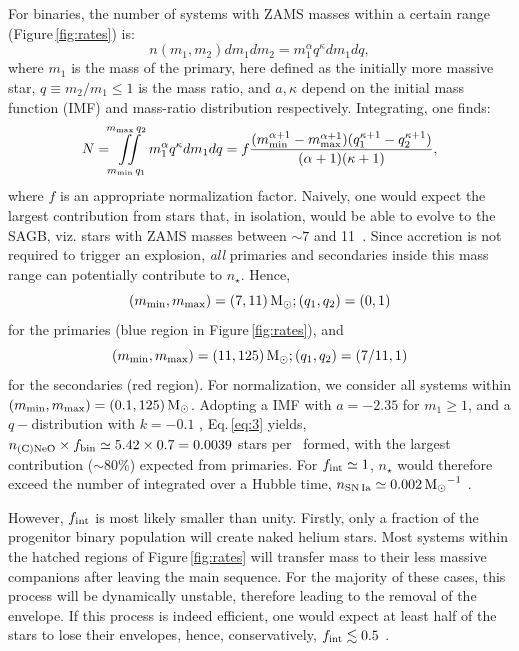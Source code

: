 \documentclass[../../main/thesis_msc.tex]{subfiles}
\begin{document}
For binaries, the number of systems with ZAMS masses within a certain range (Figure\,\ref{fig:rates}) is:
\begin{equation}
n(m_1,m_2)dm_1dm_2 = m_1^{\alpha}q^{\kappa}dm_1dq,
\end{equation}
where $m_1$ is the mass of the primary, here defined as the initially more massive star, 
$q\equiv m_2/m_1\leq 1$ is the mass ratio, and $a,\kappa$ depend on the 
initial mass function (IMF) and mass-ratio distribution respectively. Integrating, one finds:
\begin{equation}\label{eq:3}
\begin{split}
N =  
\iint\limits_{m_{\rm min}\,q_{1}}^{m_{\rm max}\,q_{2}}m_1^{\alpha}q^{\kappa}dm_1dq  
 = f\frac{(m_{\rm min}^{\alpha+1} - m_{\rm max}^{\alpha+1})(q_{1}^{\kappa+1} -  q_{2}^{\kappa+1})}{(\alpha+1)(\kappa+1)}, 
\end{split}
\end{equation}
where $f$ is an appropriate normalization factor. 
Naively, one would expect the largest contribution from stars  that, in isolation, would be able to evolve
to the SAGB, viz. stars with ZAMS masses between $\sim 7$ and 11\msun\ \citep{Farmer:2015afs}. 
Since accretion is not required to trigger an explosion, 
\emph{all} primaries and secondaries inside this mass range 
can potentially contribute to $n_\star$. Hence, $$(m_{\rm min},m_{\rm max})=(7,11)\mathrm{\,M_\odot};(q_1,q_2)=(0,1)$$ for the primaries (blue region in 
Figure\,\ref{fig:rates}), and $$(m_{\rm min},m_{\rm max})=(11,125)\mathrm{\,M_\odot};(q_1,q_2)=(7/11,1)$$ for the secondaries (red region). For normalization, we consider all systems within $(m_{\rm min},m_{\rm max})=(0.1,125)\mathrm{\,M_\odot}$. Adopting a 
\cite{Chabrier:2004vw} IMF with $a=-2.35$ for $m_1 \ge 1$, and a $q-$distribution with $k=-0.1$ \citep{Sana:2012px},
Eq.\,\ref{eq:3} yields, $n_{\rm \one}\times f_{\rm bin} \simeq 5.42\times 0.7=0.0039$ stars per \msun\ formed, with the largest contribution ($\sim 80\%$) expected from primaries. For $f_{\rm int}\simeq 1$, $n_\star$ would therefore exceed the number of \ia  integrated over a Hubble time, $n_{\rm SN\,Ia}\simeq0.002\mathrm{\,M_\odot}^{-1}$ \citep{Maoz:2013hna}.

However, $f_{\rm int}$ is most likely smaller than unity. Firstly, only a fraction of 
the progenitor binary population will create naked helium stars. Most  systems within the 
hatched regions of Figure\,\ref{fig:rates} will transfer mass to their less massive 
companions after leaving the main sequence. For the majority of these cases, 
this  process will be  dynamically unstable, therefore leading to the removal of the envelope. If this process is indeed efficient, one would expect at least half of the stars to lose their envelopes, hence, conservatively, $f_{\rm int}\lesssim 0.5$ \citep{Sana:2012px}. 
\end{document}
